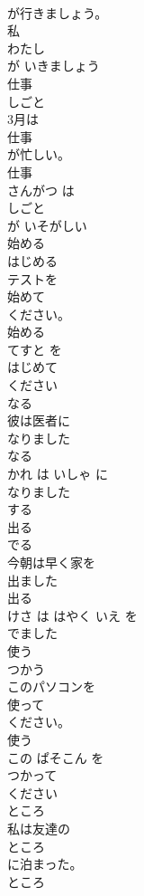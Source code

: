 \documentclass[8pt]{extreport}
\begin{document}
\begin{CJK}{UTF8}{min}
\\	が行きましょう。	
\\	私 
\\	わたし
\\	が いきましょう	
\\	仕事	
\\	しごと	
\\	3月は
\\	仕事
\\	が忙しい。	
\\	仕事 
\\	さんがつ は 
\\	しごと
\\	が いそがしい	
\\	始める	
\\	はじめる	
\\	テストを
\\	始めて
\\	ください。	
\\	始める 
\\	てすと を 
\\	はじめて
\\	ください	
\\	なる	
\\	彼は医者に
\\	なりました
\\	なる 
\\	かれ は いしゃ に 
\\	なりました
\\	する	
\\	出る	
\\	でる	
\\	今朝は早く家を
\\	出ました
\\	出る 
\\	けさ は はやく いえ を 
\\	でました
\\	使う	
\\	つかう	
\\	このパソコンを
\\	使って
\\	ください。	
\\	使う 
\\	この ぱそこん を 
\\	つかって
\\	ください	
\\	ところ	
\\	私は友達の
\\	ところ
\\	に泊まった。	
\\	ところ 

\end{CJK}
\end{document}
